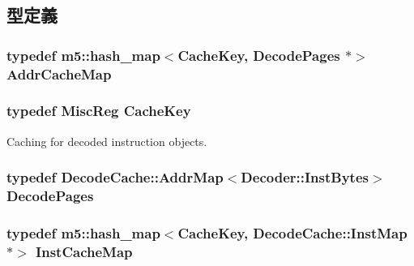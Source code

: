 \subsection{型定義}
\hypertarget{classX86ISA_1_1Decoder_a17e66c491b538e223da13acf9d77d5f2}{
\subsubsection[{AddrCacheMap}]{\setlength{\rightskip}{0pt plus 5cm}typedef m5::hash\_\-map$<${\bf CacheKey}, {\bf DecodePages} $\ast$$>$ {\bf AddrCacheMap}}}
\label{classX86ISA_1_1Decoder_a17e66c491b538e223da13acf9d77d5f2}
\hypertarget{classX86ISA_1_1Decoder_af5cdf239a38ca71d83ddcf2b9a657cbe}{
\subsubsection[{CacheKey}]{\setlength{\rightskip}{0pt plus 5cm}typedef {\bf MiscReg} {\bf CacheKey}}}
\label{classX86ISA_1_1Decoder_af5cdf239a38ca71d83ddcf2b9a657cbe}


Caching for decoded instruction objects. \hypertarget{classX86ISA_1_1Decoder_aaeb98acb07222e8d393baae60333dd32}{
\subsubsection[{DecodePages}]{\setlength{\rightskip}{0pt plus 5cm}typedef {\bf DecodeCache::AddrMap}$<${\bf Decoder::InstBytes}$>$ {\bf DecodePages}}}
\label{classX86ISA_1_1Decoder_aaeb98acb07222e8d393baae60333dd32}
\hypertarget{classX86ISA_1_1Decoder_accbfac5b46e737fd6326272fba1a8bb2}{
\subsubsection[{InstCacheMap}]{\setlength{\rightskip}{0pt plus 5cm}typedef m5::hash\_\-map$<${\bf CacheKey}, {\bf DecodeCache::InstMap} $\ast$$>$ {\bf InstCacheMap}}}
\label{classX86ISA_1_1Decoder_accbfac5b46e737fd6326272fba1a8bb2}


